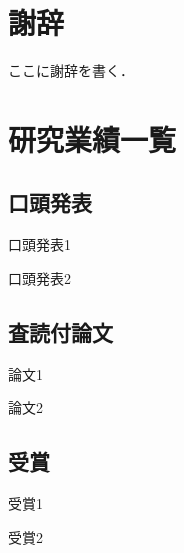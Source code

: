 \chapter{謝辞}

ここに謝辞を書く．




\chapter{研究業績一覧}

\section*{口頭発表}

\begin{業績}
 \item 口頭発表1
 \item 口頭発表2
\end{業績}

\section*{査読付論文}

\begin{業績}
 \item 論文1
 \item 論文2
\end{業績}

\section*{受賞}

\begin{業績}
 \item 受賞1
 \item 受賞2
\end{業績}
